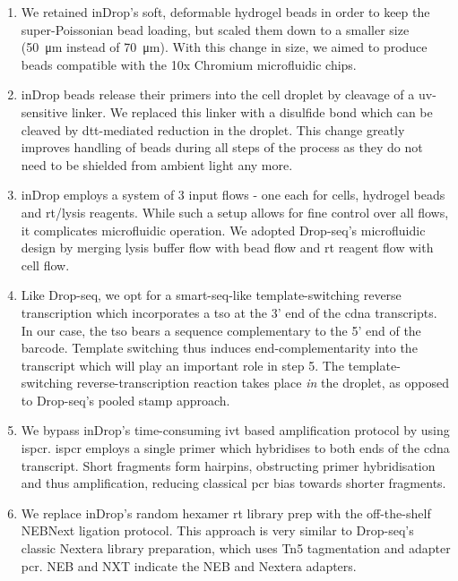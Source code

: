 \clearpage
\begin{enumerate}
	\item We retained inDrop's soft, deformable hydrogel beads in order to keep the super-Poissonian bead loading, but scaled them down to a smaller size (\SI{50}{\micro\metre} instead of \SI{70}{\micro\metre}). With this change in size, we aimed to produce beads compatible with the 10x Chromium microfluidic chips.
	\item inDrop beads release their primers into the cell droplet by cleavage of a \acrshort{uv}-sensitive linker. We replaced this linker with a disulfide bond which can be cleaved by \acrshort{dtt}-mediated reduction in the droplet. This change greatly improves handling of beads during all steps of the process as they do not need to be shielded from ambient light any more.
	\item inDrop employs a system of 3 input flows - one each for cells, hydrogel beads and \acrshort{rt}/lysis reagents. While such a setup allows for fine control over all flows, it complicates microfluidic operation. We adopted Drop-seq's microfluidic design by merging lysis buffer flow with bead flow and \acrshort{rt} reagent flow with cell flow.
	\item Like Drop-seq, we opt for a \acrshort{smart-seq}-like template-switching reverse transcription which incorporates a \acrfull{tso} at the 3' end of the \acrshort{cdna} transcripts. In our case, the \acrshort{tso} bears a sequence complementary to the 5' end of the barcode. Template switching thus induces end-complementarity into the transcript which will play an important role in step 5. The template-switching reverse-transcription reaction takes place \textit{in} the droplet, as opposed to Drop-seq's pooled \acrfull{stamp} approach.
	\item We bypass inDrop's time-consuming \acrlong{ivt} based amplification protocol by using \acrfull{ispcr}. \acrshort{ispcr} employs a single primer which hybridises to both ends of the \acrshort{cdna} transcript. Short fragments form hairpins, obstructing primer hybridisation and thus amplification, reducing classical \acrshort{pcr} bias towards shorter fragments.
	\item We replace inDrop's random hexamer \acrlong{rt} library prep with the off-the-shelf NEBNext ligation protocol. This approach is very similar to Drop-seq's classic Nextera library preparation, which uses Tn5 tagmentation and adapter \acrshort{pcr}. NEB and NXT indicate the NEB and Nextera adapters.

\end{enumerate}
